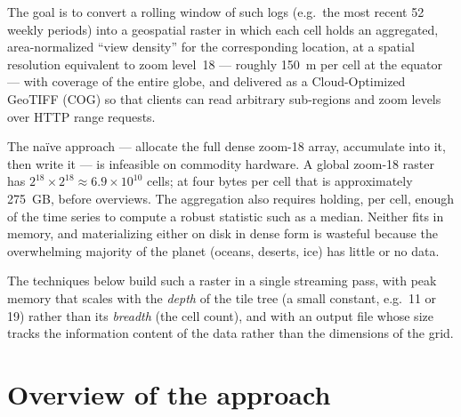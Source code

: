 \documentclass[10pt,twocolumn]{article}
\begin{document}
The goal is to convert a rolling window of such logs (e.g.\ the most recent 52
weekly periods) into a geospatial raster in which each cell holds an
aggregated, area-normalized \enquote{view density} for the corresponding
location, at a spatial resolution equivalent to zoom level~18 --- roughly
150~m per cell at the equator --- with coverage of the entire globe, and
delivered as a Cloud-Optimized GeoTIFF (COG) so that clients can read arbitrary
sub-regions and zoom levels over HTTP range requests.

The na\"ive approach --- allocate the full dense zoom-18 array, accumulate into
it, then write it --- is infeasible on commodity hardware. A global zoom-18
raster has $2^{18} \times 2^{18} \approx 6.9 \times 10^{10}$ cells; at four
bytes per cell that is approximately 275~GB, before overviews. The aggregation
also requires holding, per cell, enough of the time series to compute a robust
statistic such as a median. Neither fits in memory, and materializing either on
disk in dense form is wasteful because the overwhelming majority of the planet
(oceans, deserts, ice) has little or no data.

The techniques below build such a raster in a single streaming pass, with peak
memory that scales with the \emph{depth} of the tile tree (a small constant,
e.g.\ 11 or 19) rather than its \emph{breadth} (the cell count), and with an
output file whose size tracks the information content of the data rather than
the dimensions of the grid.

\section{Overview of the approach}
\end{document}
